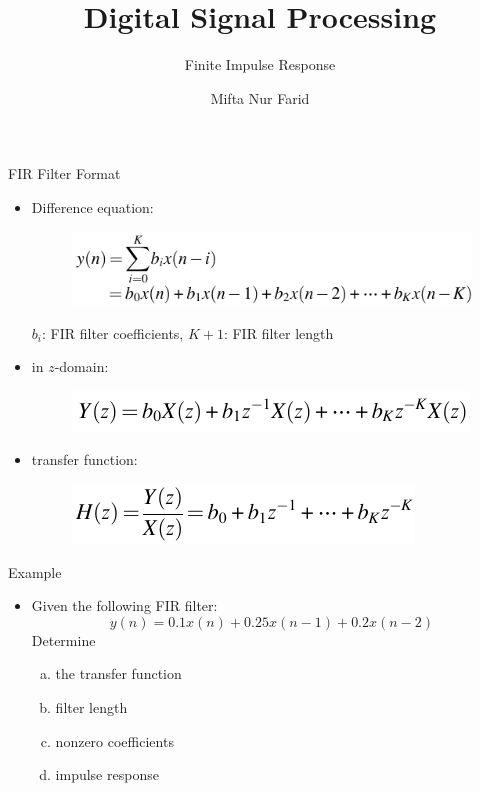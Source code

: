 \documentclass[pdflatex,compress,mathserif]{beamer}
\title{Digital Signal Processing}
\subtitle{Finite Impulse Response}
\author{Mifta Nur Farid}
\begin{document}
\maketitle

\begin{frame}{FIR Filter Format}
    \begin{itemize}
        \item Difference equation:
        \begin{figure}
            \centering
            \includegraphics[width=0.8\linewidth]{./img/img01.png}
        \end{figure}
        $b_i$: FIR filter coefficients, $K+1$: FIR filter length
        \item in $z$-domain:
        \begin{figure}
            \centering
            \includegraphics[width=0.6\linewidth]{./img/img02.png}
        \end{figure}
        \item transfer function:
        \begin{figure}
            \centering
            \includegraphics[width=0.5\linewidth]{./img/img03.png}
        \end{figure}
    \end{itemize}
\end{frame}

\begin{frame}{Example}
    \begin{itemize}
        \item Given the following FIR filter: $$ y(n) = 0.1 x(n) + 0.25 x(n-1) + 0.2 x(n-2) $$ Determine
        \begin{enumerate}[a.]
            \item the transfer function
            \item filter length
            \item nonzero coefficients
            \item impulse response
        \end{enumerate}
    \end{itemize}
\end{frame}
\end{document}

